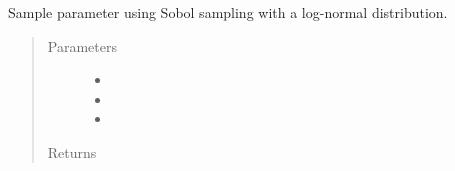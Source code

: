 \documentclass[letterpaper,10pt,english]{sphinxmanual}
\begin{document}
\begin{fulllineitems}
\label{\detokenize{yaocptool.stochastic:yaocptool.stochastic.util.sample_parameter_log_normal_distribution_with_sobol}}
Sample parameter using Sobol sampling with a log-normal distribution.
\begin{quote}\begin{description}
\item[{Parameters}] \leavevmode\begin{itemize}
\item {} 
 \textendash{} 

\item {} 
 \textendash{} 

\item {} 
 \textendash{} 

\end{itemize}

\item[{Returns}] \leavevmode


\end{description}\end{quote}

\end{fulllineitems}

\end{document}
